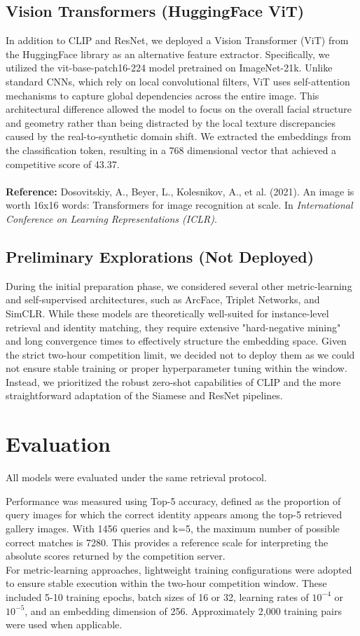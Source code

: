 \documentclass[10pt,twocolumn,letterpaper]{article}
\begin{document}
\subsection{Vision Transformers (HuggingFace ViT)} In addition to CLIP and ResNet, we deployed a Vision Transformer (ViT) from the HuggingFace library as an alternative feature extractor. Specifically, we utilized the vit-base-patch16-224 model pretrained on ImageNet-21k. Unlike standard CNNs, which rely on local convolutional filters, ViT uses self-attention mechanisms to capture global dependencies across the entire image. This architectural difference allowed the model to focus on the overall facial structure and geometry rather than being distracted by the local texture discrepancies caused by the real-to-synthetic domain shift. We extracted the embeddings from the classification token, resulting in a 768 dimensional vector that achieved a competitive score of 43.37. \\ 
\\
\textbf{Reference:} Dosovitskiy, A., Beyer, L., Kolesnikov, A., et al. (2021). An image is worth 16x16 words: Transformers for image recognition at scale. In \textit{International Conference on Learning Representations (ICLR)}.

\subsection{Preliminary Explorations (Not Deployed)} During the initial preparation phase, we considered several other metric-learning and self-supervised architectures, such as ArcFace, Triplet Networks, and SimCLR. While these models are theoretically well-suited for instance-level retrieval and identity matching, they require extensive "hard-negative mining" and long convergence times to effectively structure the embedding space. Given the strict two-hour competition limit, we decided not to deploy them as we could not ensure stable training or proper hyperparameter tuning within the window. Instead, we prioritized the robust zero-shot capabilities of CLIP and the more straightforward adaptation of the Siamese and ResNet pipelines.\\


\section{Evaluation}
All models were evaluated under the same retrieval protocol. 

Performance was measured using Top-5 accuracy, defined as the proportion of query images for which the correct identity appears among the top-5 retrieved gallery images. With 1456 queries and k=5, the maximum number of possible correct matches is 7280. This provides a reference scale for interpreting the absolute scores returned by the competition server.\\
For metric-learning approaches, lightweight training configurations were adopted to ensure stable execution within the two-hour competition window. These included 5-10 training epochs, batch sizes of 16 or 32, learning rates of $10^{-4}$ or $10^{-5}$, and an embedding dimension of 256. Approximately 2,000 training pairs were used when applicable.
\end{document}

